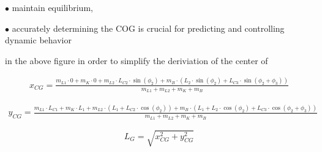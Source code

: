 \begin{itemize}
	$\bullet$ maintain equilibrium, 
	
	$\bullet$ accurately determining the COG is crucial for predicting and controlling dynamic behavior
	
	
	in the above figure in order to simplify the deriviation of the center of 
	
	\begin{equation}
		\begin{aligned}
			x_{CG} = \frac{m_{L1} \cdot 0 + m_K \cdot 0 + m_{L2} \cdot L_{C2} \cdot \sin(\phi_2) + m_B \cdot (L_2 \cdot \sin(\phi_2) + L_{C3} \cdot \sin(\phi_2 + \phi_3))}{m_{L1} + m_{L2} + m_K + m_B}
		\end{aligned}
	\end{equation}
	
	\begin{equation}
		\begin{aligned}
			y_{CG} = \frac{m_{L1} \cdot L_{C1} + m_K \cdot L_1 + m_{L2} \cdot (L_1 + L_{C2} \cdot \cos(\phi_2)) + m_B \cdot (L_1 + L_2 \cdot \cos(\phi_2) + L_{C3} \cdot \cos(\phi_2 + \phi_3))}{m_{L1} + m_{L2} + m_K + m_B}
		\end{aligned}
	\end{equation}
	
	
	\begin{equation}
		L_G = \sqrt{x_{CG}^2 + y_{CG}^2}
	\end{equation}
	

\end{itemize}
